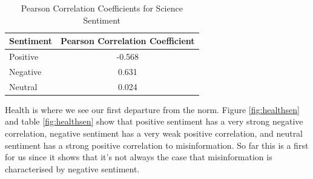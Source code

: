 \documentclass{l4proj}
\begin{document}
\begin{table}[h]
\begin{minipage}[c]{\linewidth}
\centering
\begin{tabular}{@{}ll@{}}
\toprule
Sentiment & Pearson Correlation Coefficient \\ \midrule
Positive  & \multicolumn{1}{c}{-0.568}      \\
Negative  & \multicolumn{1}{c}{0.631}       \\
Neutral   & \multicolumn{1}{c}{0.024}       \\ \bottomrule
\end{tabular}
\caption{Pearson Correlation Coefficients for Science Sentiment}
\label{tab:scisen}
\end{minipage}\hfill

\end{table}

Health is where we see our first departure from the norm. Figure \ref{fig:healthsen} and table \ref{fig:healthsen} show that positive sentiment has a very strong negative correlation, negative sentiment has a very weak positive correlation, and neutral sentiment has a strong positive correlation to misinformation. So far this is a first for us since it shows that it's not always the case that misinformation is characterised by negative sentiment.
\end{document}
